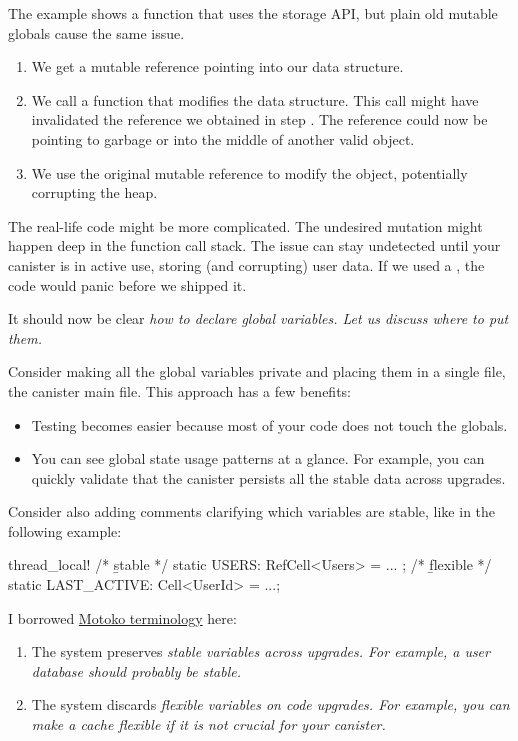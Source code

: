\documentclass{article}
\begin{document}
The example shows a function that uses the storage API, but plain old mutable globals cause the same issue.
\begin{enumerate}
\item We get a mutable reference pointing into our data structure.
\item 
  We call a function that modifies the data structure.
  This call might have invalidated the reference we obtained in step .
  The reference could now be pointing to garbage or into the middle of another valid object.
\item 
  We use the original mutable reference to modify the object, potentially corrupting the heap.
\end{enumerate}

The real-life code might be more complicated.
The undesired mutation might happen deep in the function call stack.
The issue can stay undetected until your canister is in active use, storing (and corrupting) user data.
If we used a , the code would panic before we shipped it.

It should now be clear \em{how} to declare global variables.
Let us discuss \em{where} to put them.


Consider making all the global variables private and placing them in a single file, the canister main file.
This approach has a few benefits:

\begin{itemize}
 \item Testing becomes easier because most of your code does not touch the globals.
 \item 
   You can see global state usage patterns at a glance.
   For example, you can quickly validate that the canister persists all the stable data across upgrades.
\end{itemize}

Consider also adding comments clarifying which variables are stable, like in the following example:

\begin{code}[good]
thread_local! {
    /* \b{stable}    */ static USERS: RefCell<Users> = ... ;
    /* \b{flexible}  */ static LAST_ACTIVE: Cell<UserId> = ...;
}
\end{code}

I borrowed \href{https://sdk.dfinity.org/docs/language-guide/upgrades.html#_declaring_stable_variables}{Motoko terminology} here:
\begin{enumerate}
  \item 
    The system preserves \em{stable} variables across upgrades.
    For example, a user database should probably be stable.
  \item 
    The system discards \em{flexible} variables on code upgrades.
    For example, you can make a cache flexible if it is not crucial for your canister.
\end{enumerate}
\end{document}
